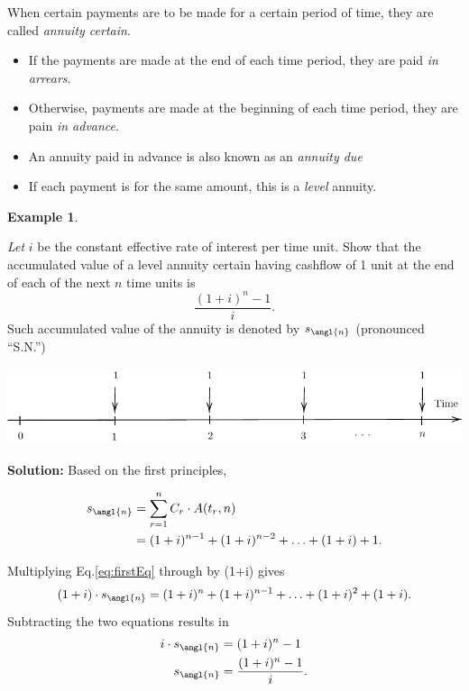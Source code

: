 \documentclass[landscape, 20pt]{extreport}
\theoremstyle{definition}
\theoremstyle{definition}
\newtheorem{example}{Example}[chapter]
\theoremstyle{definition}
\theoremstyle{definition}
\theoremstyle{remark}
\begin{document}
When certain payments are to be made for a certain period of time, they are called \emph{annuity certain}.

\begin{itemize}
\item
  If the payments are made at the end of each time period, they are paid \emph{in arrears}.
\item
  Otherwise, payments are made at the beginning of each time period,
  they are pain \emph{in advance}.
\item
  An annuity paid in advance is also known as an \emph{annuity due}
\item
  If each payment is for the same amount, this is a \emph{level} annuity.
\end{itemize}

\newpage \begin{example}
\protect\hypertarget{exm:unlabeled-div-25}{}\label{exm:unlabeled-div-25}

\emph{Let} \(i\) be the constant effective rate of interest per time unit. Show
that the accumulated value of a level annuity certain having cashflow of
1 unit at the end of each of the next \(n\) time units is
\[\frac{(1+i)^n -1 }{i}.\] Such accumulated value of the annuity is
denoted by \(s_\angl{n}\) (pronounced ``S.N.'')

\end{example}

\begin{center}\includegraphics{tikz-ex9-1} \end{center}

\textbf{Solution:} Based on the first principles,

\begin{align} 
 s_\angl{n} &= \sum_{r=1}^n C_r \cdot A(t_r,n) \\
    &= (1+i)^{n-1} + (1+i)^{n-2} + \ldots + (1+i) + 1. \label{eq:firstEq} 
\end{align}

Multiplying Eq.\eqref{eq:firstEq} through by (1+i) gives \begin{equation}
    (1+i) \cdot s_\angl{n}  = (1+i)^{n} + (1+i)^{n-1} + \ldots + (1+i)^2 + (1+i). 
\end{equation} Subtracting the two equations results in
\[\begin{aligned}
    i \cdot s_\angl{n} &= (1+i)^{n} - 1\\
        s_\angl{n} &= \frac{(1+i)^{n} - 1}{i}.\end{aligned}\]
\end{document}

